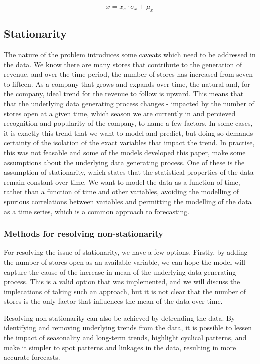 \begin{equation}
  x = x_{s} \cdot \sigma_x + \mu_x
\end{equation}


\subsection{Stationarity}
The nature of the problem introduces some caveats which need to be addressed in
the data. We know there are many stores that contribute to the generation of
revenue, and over the time period, the number of stores has increased from
seven to fifteen. As a company that grows and expands over time, the natural
and, for the company, ideal trend for the revenue to follow is upward. This
means that that the underlying data generating process changes - impacted by
the number of stores open at a given time, which season we are currently in and
percieved recognition and popularity of the company, to name a few factors. In
some cases, it is exactly this trend that we want to model and predict, but
doing so demands certainty of the isolation of the exact variables that impact
the trend. In practise, this was not feasable and some of the models developed
this paper, make some assumptions about the underlying data generating process.
One of these is the assumption of stationarity, which states that the
statistical properties of the data remain constant over time. We want to model
the data as a function of time, rather than a function of time and other
variables, avoiding the modelling of spurious correlations between variables
and permitting the modelling of the data as a time series, which is a common
approach to forecasting. 

\subsubsection{Methods for resolving non-stationarity}

For resolving the issue of stationarity, we have a few options. Firstly, by
adding the number of stores open as an available variable, we can hope the
model will capture the cause of the increase in mean of the underlying data
generating process. This is a valid option that was implemented, and we will
discuss the implecations of taking such an approach, but it is not clear that
the number of stores is the only factor that influences the mean of the data
over time. 

Resolving non-stationarity can also be achieved by detrending the data. By
identifying and removing underlying trends from the data, it is possible to
lessen the impact of seasonality and long-term trends, highlight cyclical
patterns, and make it simpler to spot patterns and linkages in the data,
resulting in more accurate forecasts. 

